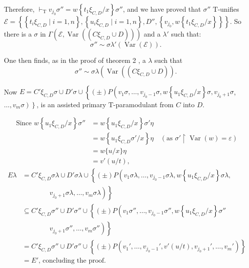 \documentclass[letterpaper]{report}
\begin{document}
Therefore, $\vdash_{\mathrm{T}} v_{j_0} \sigma''=w\left\{t_1 \xi_{C, D} / x\right\} \sigma''$, and we have proved that $\sigma''$ $\mathrm{T}$-unifies $\mathcal{E}=\left\{\left\{t_i \xi_{C, D} \mid i=1, n\right\},\left\{u_i \xi_{C, D} \mid i=1, n\right\}, D'',\left\{v_{j_0}, w\left\{t_1 \xi_{C, D} / x\right\}\right\}\right\}$. So there is a $\sigma$ in $\Gamma\left(\mathcal{E}, \operatorname{Var}\left(\left(C \xi_{C, D} \cup D\right)\right)\right)$ and a $\lambda'$ such that:
$$
\sigma'' \sim \sigma \lambda'(\operatorname{Var}(\mathcal{E})) \text {. }
$$

One then finds, as in the proof of theorem 2 , a $\lambda$ such that
$$
\sigma'' \sim \sigma \lambda\left(\operatorname{Var}\left(\left(C \xi_{C, D} \cup D\right)\right)\right. \text {. }
$$

Now $E=C' \xi_{C, D} \sigma \cup D' \sigma \cup\left\{( \pm) P\left(v_1 \sigma, \ldots, v_{j_0-1} \sigma, w\left\{u_1 \xi_{C, D} / x\right\} \sigma, v_{j_0+1} \sigma\right.\right.$, $\left.\left.\ldots, v_m \sigma\right)\right\}$, is an assisted primary $\mathrm{T}$-paramodulant from $C$ into $D$.

$$
\begin{aligned}
	\text{Since } w\left\{u_1 \xi_{C, D} / x\right\} \sigma'' & =w\left\{u_1 \xi_{C, D} / x\right\} \sigma' \eta \\
	& =w\left\{u_1 \xi_{C, D} \sigma' / x\right\} \eta \quad\left(\text{as } \sigma' \upharpoonright \operatorname{Var}(w)=\varepsilon\right) \\
	& =w\{u / x\} \eta \\
	& =v'(u / t),
\end{aligned}
$$
$$
\begin{aligned}
	E \lambda &=C' \xi_{C, D} \sigma \lambda \cup D' \sigma \lambda \cup\left\{( \pm ) P \left(v_1 \sigma \lambda, \ldots, v_{j_0-1} \sigma \lambda, w\left\{u_1 \xi_{C, D} / x\right\} \sigma \lambda,\right.\right. \\
	& \qquad \qquad \left.\left.v_{j_0+1} \sigma \lambda, \ldots, v_m \sigma \lambda\right)\right\} \\
	& \subseteq C' \xi_{C, D} \sigma'' \cup D' \sigma'' \cup\left\{( \pm ) P \left(v_1 \sigma'', \ldots, v_{j_0-1} \sigma'', w\left\{u_1 \xi_{C, D} / x\right\} \sigma''\right.\right. \\
	& \qquad  \qquad \left.\left.v_{j_0+1} \sigma'', \ldots, v_m \sigma''\right)\right\} \\
	& =C' \xi_{C, D} \sigma'' \cup D' \sigma'' \cup\left\{( \pm) P\left(v_1', \ldots, v_{j_0-1}', v'(u / t), v_{j_0+1}', \ldots, v_m'\right)\right\} \\
	& =E' \text {, concluding the proof. } \\
	&
\end{aligned}
$$
\end{document}

